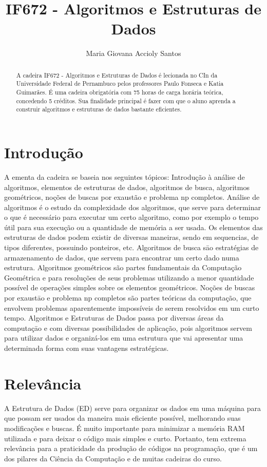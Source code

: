 \documentclass[a4paper]{article}
\title{IF672 - Algoritmos e Estruturas de Dados}
\date{\vspace{-5ex}}
\author{Maria Giovana Accioly Santos}
\begin{document}
\maketitle

\begin{abstract}
A cadeira IF672 - Algoritmos e Estruturas de Dados é lecionada no CIn da Universidade Federal de Pernambuco pelos professores Paulo Fonseca e Katia Guimarães. É uma cadeira obrigatória com 75 horas de carga horária teórica, concedendo 5 créditos. Sua finalidade principal é fazer com que o aluno aprenda a construir algoritmos e estruturas de dados bastante eficientes.
\end{abstract}

\section*{Introdução}

A ementa da cadeira se baseia nos seguintes tópicos: Introdução à análise de algoritmos, elementos de estruturas de dados, algoritmos de busca, algoritmos geométricos, noções de buscas por exaustão e problema np completos.
Análise de algoritmos é o estudo da complexidade dos algoritmos, que serve para determinar o que é necessário para executar um certo algoritmo, como por exemplo o tempo útil para sua execução ou a quantidade de memória a ser usada. Os elementos das estruturas de dados podem existir de diversas maneiras, sendo em sequencias, de tipos diferentes, possuindo ponteiros, etc. Algoritmos de busca sāo estratégias de armazenamento de dados, que servem para encontrar um certo dado numa estrutura. Algoritmos geométricos são partes fundamentais da Computação Geométrica e para resoluções de seus problemas utilizando a menor quantidade possível de operações simples sobre os elementos geométricos. Noções de buscas por exaustāo e problema np completos são partes teóricas da computação, que envolvem problemas aparentemente impossíveis de serem resolvidos em um curto tempo.
	Algoritmos e Estruturas de Dados passa por diversas áreas da computaçāo e com diversas possibilidades de aplicação, pois algoritmos servem para utilizar dados e organizá-los em uma estrutura que vai apresentar uma determinada forma com suas vantagens estratégicas.

\section*{Relevância}

A Estrutura de Dados (ED) serve para organizar os dados em uma máquina para que possam ser usados da maneira mais eficiente possível, melhorando suas modificações e buscas. É muito importante para minimizar a memória RAM utilizada e para deixar o código mais simples e curto. Portanto, tem extrema relevância para a praticidade da produção de códigos na programação, que é um dos pilares da Ciência da Computação e de muitas cadeiras do curso.
\end{document}

